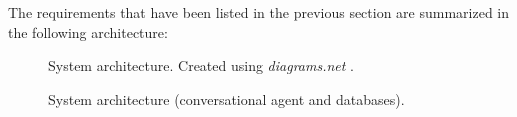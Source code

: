 \documentclass[12pt,english]{article}
\begin{document}
The requirements that have been listed in the previous section are summarized in the following architecture:
\begin{figure}[H]
    \caption{System architecture. Created using \emph{diagrams.net} \protect\cite{drawio}.}
\end{figure}

\begin{figure}[H]
    \caption{System architecture (conversational agent and databases).}
\end{figure}
\end{document}

